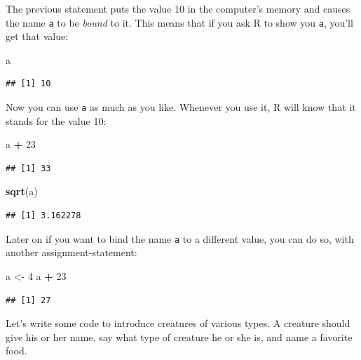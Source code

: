 \documentclass[]{book}
\makeatletter
\newenvironment{Shaded}{\begin{snugshade}}{\end{snugshade}}
\newcommand{\KeywordTok}[1]{\textcolor[rgb]{0.13,0.29,0.53}{\textbf{#1}}}
\newcommand{\DecValTok}[1]{\textcolor[rgb]{0.00,0.00,0.81}{#1}}
\newcommand{\StringTok}[1]{\textcolor[rgb]{0.31,0.60,0.02}{#1}}
\newcommand{\OperatorTok}[1]{\textcolor[rgb]{0.81,0.36,0.00}{\textbf{#1}}}
\newcommand{\NormalTok}[1]{#1}
\newenvironment{kframe}{%
\medskip{}
\setlength{\fboxsep}{.8em}
 \def\at@end@of@kframe{}%
 \ifinner\ifhmode%
  \def\at@end@of@kframe{\end{minipage}}%
  \begin{minipage}{\columnwidth}%
 \fi\fi%
 \def\FrameCommand##1{\hskip\@totalleftmargin \hskip-\fboxsep
 \colorbox{shadecolor}{##1}\hskip-\fboxsep
     \hskip-\linewidth \hskip-\@totalleftmargin \hskip\columnwidth}%
 \MakeFramed {\advance\hsize-\width
   \@totalleftmargin\z@ \linewidth\hsize
   \@setminipage}}%
 {\par\unskip\endMakeFramed%
 \at@end@of@kframe}
\renewenvironment{Shaded}{\begin{kframe}}{\end{kframe}}
\theoremstyle{definition}
\theoremstyle{definition}
\theoremstyle{definition}
\theoremstyle{remark}
\makeatother
\begin{document}
The previous statement puts the value 10 in the computer's memory and
causes the name \texttt{a} to be \emph{bound} to it. This means that if
you ask R to show you \texttt{a}, you'll get that value:

\begin{Shaded}
\begin{Highlighting}[]
\NormalTok{a}
\end{Highlighting}
\end{Shaded}

\begin{verbatim}
## [1] 10
\end{verbatim}

Now you can use \texttt{a} as much as you like. Whenever you use it, R
will know that it stands for the value 10:

\begin{Shaded}
\begin{Highlighting}[]
\NormalTok{a }\OperatorTok{+}\StringTok{ }\DecValTok{23}
\end{Highlighting}
\end{Shaded}

\begin{verbatim}
## [1] 33
\end{verbatim}

\begin{Shaded}
\begin{Highlighting}[]
\KeywordTok{sqrt}\NormalTok{(a)}
\end{Highlighting}
\end{Shaded}

\begin{verbatim}
## [1] 3.162278
\end{verbatim}

Later on if you want to bind the name \texttt{a} to a different value,
you can do so, with another assignment-statement:

\begin{Shaded}
\begin{Highlighting}[]
\NormalTok{a <-}\StringTok{ }\DecValTok{4}
\NormalTok{a }\OperatorTok{+}\StringTok{ }\DecValTok{23}
\end{Highlighting}
\end{Shaded}

\begin{verbatim}
## [1] 27
\end{verbatim}

Let's write some code to introduce creatures of various types. A
creature should give his or her name, say what type of creature he or
she is, and name a favorite food.
\end{document}
